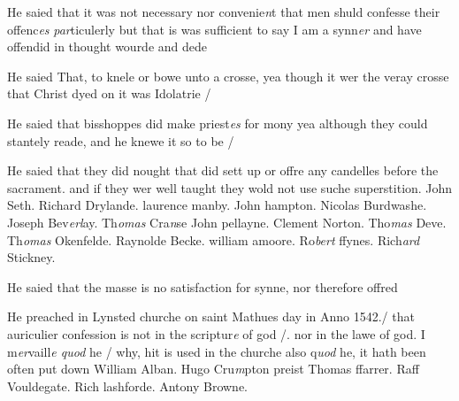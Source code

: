 \documentclass[12pt, a4paper]{book}
\begin{document}
 
 	
			
 	
		\ifthenelse{\isodd{\thepage}}
		{\reversemarginpar}
		{\normalmarginpar}
		He saied that it was not necessary nor convenie\textit{n}t
 that men shuld confesse their offenc\textit{es}
                  \textit{par}ticulerly
 but that is was sufficient to say I am a synn\textit{er}
 and have offendid in thought wourde and dede
 

			
	
		\ifthenelse{\isodd{\thepage}}
		{\reversemarginpar}
		{\normalmarginpar}
		He saied That, to knele or bowe unto a crosse,
 yea though it wer the veray crosse that Christ
 dyed on it was Idolatrie /
 
 	
				\marginpar[\vspace{0.5cm}{\textcolor{Gray}{seditious}}]{}
			
 	
		\ifthenelse{\isodd{\thepage}}
		{\reversemarginpar}
		{\normalmarginpar}
		He saied that bisshoppes did make priest\textit{es} for mony
 yea although they could stantely reade, and he
 knewe it so to be /

	
				\marginpar[\vspace{0.5cm}{\textcolor{Gray}{candelles}}]{}
			
	
		\ifthenelse{\isodd{\thepage}}
		{\reversemarginpar}
		{\normalmarginpar}
		He saied that they did nought that did sett up or
 offre any candelles before the sacrament. and if
 they wer well taught they wold not use suche
 superstition. John Seth. Richard Drylande. laurence manby.
 	John hampton. Nicolas Burdwashe. Joseph Bev\textit{erl}ay. Th\textit{omas} Cra\textit{n}se
 	John pellayne. Clement Norton. Tho\textit{mas} Deve. Th\textit{omas} Okenfelde.
 	Raynolde Becke. william amoore. Ro\textit{bert }ffynes. Rich\textit{ard} Stickney.
			
 He saied that the masse is no satisfaction for
 synne, nor therefore offred
 
			
		\ifthenelse{\isodd{\thepage}}
		{\reversemarginpar}
		{\normalmarginpar}
		He preached in Lynsted churche on saint Mathues
 day in Anno 1542./ that auriculier confession is not
 in the scriptur\textit{e} of god /. nor in the lawe of god.
 I m\textit{er}vaill\textit{e quod} he / why, hit is used in the churche
 also q\textit{uod} he, it hath been often put down
 	William Alban. Hugo Cru\textit{m}pton preist Thomas ffarrer.
 	Raff Vouldegate. Rich lashforde. Antony Browne.
\end{document}
